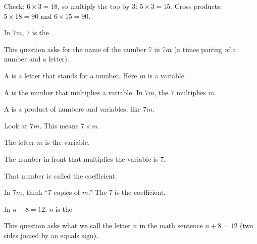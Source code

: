 
\noindent Check: $6 \times 3 = 18$, so multiply the top by $3$:
$5 \times 3 = 15$. Cross products: $5 \times 18 = 90$ and $6 \times 15 = 90$.



\noindent In $7m$, $7$ is the \blank[3.2cm]


\noindent This question asks for the name of the number $7$ in $7m$ (a times
pairing of a number and a letter).

\begin{words}
  \item A is a letter that stands for a number. Here $m$ is a variable.
  \item A is the number that multiplies a variable. In $7m$, the
        $7$ multiplies $m$.
  \item A is a product of numbers and variables, like $7m$.
\end{words}

\begin{steps}
  \item Look at $7m$. This means $7 \times m$.
  \item The letter $m$ is the variable.
  \item The number in front that multiplies the variable is $7$.
  \item That number is called the coefficient.
\end{steps}


\noindent In $7m$, think ``$7$ copies of $m$.'' The $7$ is the coefficient.


\noindent In $n + 8 = 12$, $n$ is the \blank[3.2cm]


\noindent This question asks what we call the letter $n$ in the math sentence
$n + 8 = 12$ (two sides joined by an equals sign).

